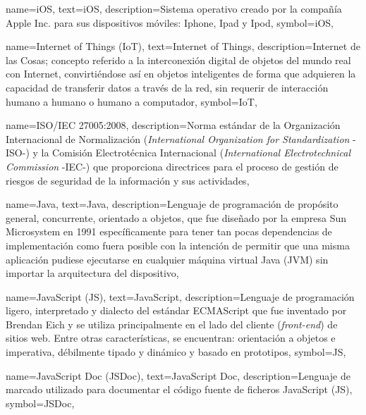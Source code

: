 {
    name={iOS},
    text={iOS},
    description={Sistema operativo creado por la compañía Apple Inc. para sus dispositivos móviles: Iphone, Ipad y Ipod},
    symbol={iOS},
} 
  	  
{
    name={Internet of Things (IoT)},
    text={Internet of Things},
    description={Internet de las Cosas; concepto referido a la interconexión digital de objetos del mundo real con Internet, convirtiéndose así en objetos inteligentes de forma que adquieren la capacidad de transferir datos a través de la red, sin requerir de interacción humano a humano o humano a computador},
    symbol={IoT},
}
  
{
    name={ISO/IEC 27005:2008},
    description={Norma estándar de la Organización Internacional de Normalización (\textit{International Organization for Standardization} -ISO-) y la Comisión Electrotécnica Internacional (\textit{International Electrotechnical Commission} -IEC-) que proporciona directrices para el proceso de gestión de riesgos de seguridad de la información y sus actividades},
}

{
    name={Java},
    text={Java},
    description={Lenguaje de programación de propósito general, concurrente, orientado a objetos, que fue diseñado por la empresa Sun Microsystem en 1991 específicamente para tener tan pocas dependencias de implementación como fuera posible con la intención de permitir que una misma aplicación pudiese ejecutarse en cualquier máquina virtual Java (JVM) sin importar la arquitectura del dispositivo},
}

{
    name={JavaScript (JS)},
    text={JavaScript},
    description={Lenguaje de programación ligero, interpretado y dialecto del estándar ECMAScript que fue inventado por Brendan Eich y se utiliza principalmente en el lado del cliente (\textit{front-end}) de sitios web. Entre otras características, se encuentran: orientación a objetos e imperativa, débilmente tipado y dinámico y basado en prototipos},
	symbol={JS},
}

{
    name={JavaScript Doc (JSDoc)},
    text={JavaScript Doc},
    description={Lenguaje de marcado utilizado para documentar el código fuente de ficheros JavaScript (JS)},
    symbol={JSDoc},
}

